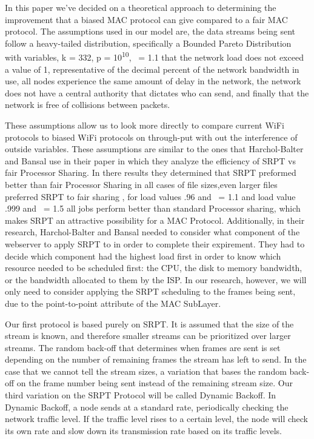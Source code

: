 \documentclass{sigcomm-alternate}
\begin{document}
In this paper we've decided on a theoretical approach to determining the improvement that a biased MAC protocol can give compared to a fair MAC protocol. The assumptions used in our model are, the data streams being sent follow a heavy-tailed distribution, specifically a Bounded Pareto Distribution with variables, k = 332, p = 10\textsuperscript{10}, \textalpha\  = 1.1
 that the network load does not exceed a value of 1, representative of the decimal percent of the network bandwidth in use, all nodes experience the same amount of delay in the network, the network does not have a central authority that dictates who can send, and finally that the network is free of collisions between packets. 

These assumptions allow us to look more directly to compare current WiFi protocols to biased WiFi protocols on through-put with out the interference of outside variables. These assumptions are similar to the ones that Harchol-Balter and Bansal use in their paper \cite{Unfair} in which they analyze the efficiency of SRPT vs fair Processor Sharing. In there results they determined that SRPT preformed better than fair Processor Sharing in all cases of file sizes,even larger files preferred SRPT to fair sharing \cite{Unfair}, for load values .96 and \textalpha\ = 1.1 and load value .999 and \textalpha\ = 1.5 all jobs perform better than standard Processor sharing, which makes SRPT an attractive possibility for a MAC Protocol. Additionally, in their research, Harchol-Balter and Bansal needed to consider what component of the webserver to apply SRPT to in order to complete their expirement. They had to decide which component had the highest load first in order to know which resource needed to be scheduled first: the CPU, the disk to memory bandwidth, or the bandwidth allocated to them by the ISP. In our research, however, we will only need to consider applying the SRPT scheduling to the frames being sent, due to the point-to-point attribute of the MAC SubLayer. 

Our first protocol is based purely on SRPT. It is assumed that the size of the stream is known, and therefore smaller streams can be prioritized over larger streams. The random back-off that determines when frames are sent is set depending on the number of remaining frames the stream has left to send. In the case that we cannot tell the stream sizes, a variation that bases the random back-off on the frame number being sent instead of the remaining stream size. Our third variation on the SRPT Protocol will be called Dynamic Backoff. In Dynamic Backoff, a node sends at a standard rate, periodically checking the network traffic level. If the traffic level rises to a certain level, the node will check its own rate and slow down its transmission rate based on its traffic levels. 
\end{document}
